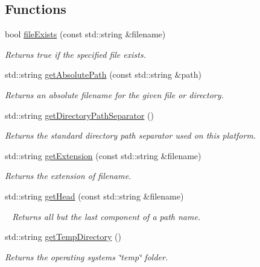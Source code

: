 \subsection*{Functions}
\begin{DoxyCompactItemize}
\item 
bool \mbox{\hyperlink{namespacesgl_1_1priv_1_1filelib_afdd89841220a8b18e39e0844a833a18b}{file\+Exists}} (const std\+::string \&filename)
\begin{DoxyCompactList}\small\item\em Returns {\ttfamily true} if the specified file exists. \end{DoxyCompactList}\item 
std\+::string \mbox{\hyperlink{namespacesgl_1_1priv_1_1filelib_a7fbee27e6758dc2b1c867d3a0f86ef3a}{get\+Absolute\+Path}} (const std\+::string \&path)
\begin{DoxyCompactList}\small\item\em Returns an absolute filename for the given file or directory. \end{DoxyCompactList}\item 
std\+::string \mbox{\hyperlink{namespacesgl_1_1priv_1_1filelib_a3b2cb6905e3c1893b865272b0b370a1d}{get\+Directory\+Path\+Separator}} ()
\begin{DoxyCompactList}\small\item\em Returns the standard directory path separator used on this platform. \end{DoxyCompactList}\item 
std\+::string \mbox{\hyperlink{namespacesgl_1_1priv_1_1filelib_ab0ca25cac63d69dc0a0cd4d4f4e6ceb7}{get\+Extension}} (const std\+::string \&filename)
\begin{DoxyCompactList}\small\item\em Returns the extension of {\ttfamily filename}. \end{DoxyCompactList}\item 
std\+::string \mbox{\hyperlink{namespacesgl_1_1priv_1_1filelib_a2c275b431da9932dc59b4995cb8a832f}{get\+Head}} (const std\+::string \&filename)
\begin{DoxyCompactList}\small\item\em ~\newline
 Returns all but the last component of a path name. \end{DoxyCompactList}\item 
std\+::string \mbox{\hyperlink{namespacesgl_1_1priv_1_1filelib_a10310c73e4177a77e32b1633fe7f515a}{get\+Temp\+Directory}} ()
\begin{DoxyCompactList}\small\item\em Returns the operating system\textquotesingle{}s \char`\"{}temp\char`\"{} folder. \end{DoxyCompactList}\item 

\end{DoxyCompactItemize}
